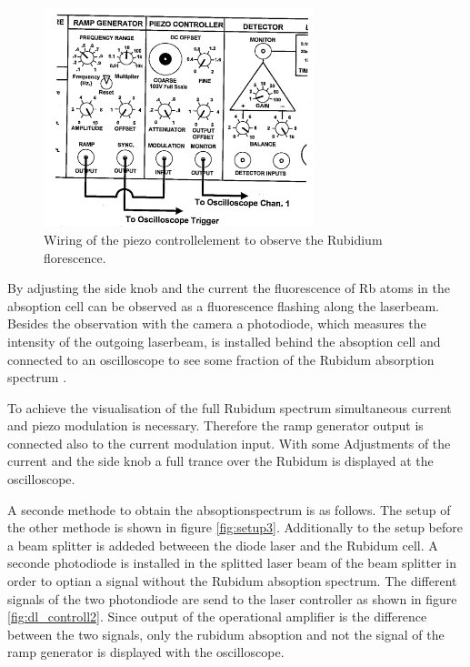 \begin{figure}
  \centering
  \includegraphics[width=0.7\textwidth]{wiring.png}
  \caption{Wiring of the piezo controllelement to observe the Rubidium florescence.\cite{V61}}
  \label{fig:dl_controll}
\end{figure}

By adjusting the side knob and the current
the fluorescence of Rb atoms in the absoption cell
can be observed
as a fluorescence flashing along the laserbeam.
Besides the observation with the camera a photodiode,
which measures the intensity
of the outgoing laserbeam,
is installed behind the absoption cell and
connected to an oscilloscope to
see some fraction of the Rubidum absorption spectrum .

To achieve the visualisation of the full Rubidum
spectrum
simultaneous current and piezo modulation
is necessary. Therefore the ramp generator output
is connected also to the current modulation input.
With some Adjustments of the current and the side knob
a full trance over the Rubidum is displayed at the  oscilloscope.

A seconde methode to obtain the absoptionspectrum
is as follows.
The setup of the other methode is shown in
figure \ref{fig:setup3}.
Additionally to the setup before a beam splitter is addeded
betweeen the diode laser and the Rubidum cell.
A seconde photodiode is installed in the splitted laser beam of the beam splitter
in order to optian a signal without the Rubidum absoption spectrum.
The different signals of the two photondiode are send to the
laser controller as shown in figure \ref{fig:dl_controll2}.
Since output of the operational amplifier is
the  difference between the two signals,
only the rubidum absoption and not the signal of the ramp generator is
displayed with the oscilloscope.

